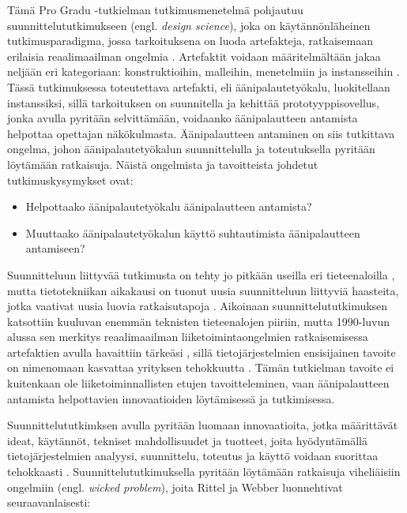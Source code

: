 \documentclass[utf8]{gradu3}
\begin{document}
Tämä Pro Gradu -tutkielman tutkimusmenetelmä pohjautuu suunnittelututkimukseen (engl. \textit{design science}), joka on käytännönläheinen tutkimusparadigma, jossa tarkoituksena on luoda artefakteja, ratkaisemaan erilaisia reaalimaailman ongelmia \parencite[][]{hevner2004}. Artefaktit voidaan määritelmältään jakaa neljään eri kategoriaan: konstruktioihin, malleihin, menetelmiin ja instansseihin \parencite[][]{hevner2004}. Tässä tutkimuksessa toteutettava artefakti, eli äänipalautetyökalu, luokitellaan instanssiksi, sillä tarkoituksen on suunnitella ja kehittää prototyyppisovellus, jonka avulla pyritään selvittämään, voidaanko äänipalautteen antamista helpottaa opettajan näkökulmasta. Äänipalautteen antaminen on siis tutkittava ongelma, johon äänipalautetyökalun suunnittelulla ja toteutuksella pyritään löytämään ratkaisuja. Näistä ongelmista ja tavoitteista johdetut tutkimuskysymykset ovat:

\begin{itemize}
  \item Helpottaako äänipalautetyökalu äänipalautteen antamista?
  \item Muuttaako äänipalautetyökalun käyttö suhtautimista äänipalautteen antamiseen?
\end{itemize}

Suunnitteluun liittyvää tutkimusta on tehty jo pitkään useilla eri tieteenaloilla \parencite[][]{cross2001}, mutta tietotekniikan aikakausi on tuonut uusia suunnitteluun liittyviä haasteita, jotka vaativat uusia luovia ratkaisutapoja \parencite[][]{design}. Aikoinaan suunnittelututkimuksen katsottiin kuuluvan enemmän teknisten tieteenalojen piiriin, mutta 1990-luvun alussa sen merkitys reaalimaailman liiketoimintaongelmien ratkaisemisessa artefaktien avulla havaittiin tärkeäsi \parencite[][]{design}, sillä tietojärjestelmien ensisijainen tavoite on nimenomaan kasvattaa yrityksen tehokkuutta \parencite[][]{hevner2004}. Tämän tutkielman tavoite ei kuitenkaan ole liiketoiminnallisten etujen tavoitteleminen, vaan äänipalautteen antamista helpottavien innovaatioiden löytämisessä ja tutkimisessa.

Suunnittelututkimksen avulla pyritään luomaan innovaatioita, jotka määrittävät ideat, käytännöt, tekniset mahdollisuudet ja tuotteet, joita hyödyntämällä tietojärjestelmien analyysi, suunnittelu, toteutus ja käyttö voidaan suorittaa tehokkaasti \parencite[][]{hevner2004}. Suunnittelututkimuksella pyritään löytämään ratkaisuja viheliäisiin ongelmiin (engl. \textit{wicked problem}), joita Rittel ja Webber \parencite[][]{wicked} luonnehtivat seuraavanlaisesti: 
\end{document}
